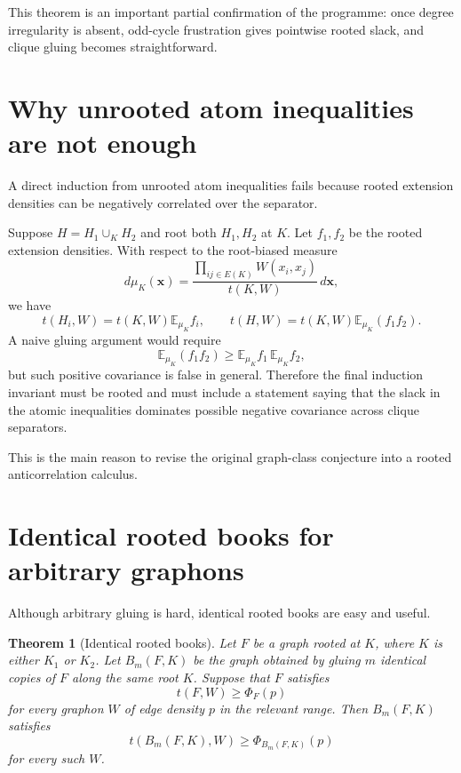 \documentclass[11pt]{article}
\newtheorem{theorem}{Theorem}[section]
\theoremstyle{definition}
\newcommand{\E}{\mathbb E}
\begin{document}
This theorem is an important partial confirmation of the programme: once degree irregularity is absent, odd-cycle frustration gives pointwise rooted slack, and clique gluing becomes straightforward.

\section{Why unrooted atom inequalities are not enough}

A direct induction from unrooted atom inequalities fails because rooted extension densities can be negatively correlated over the separator.

Suppose $H=H_1\cup_K H_2$ and root both $H_1,H_2$ at $K$.  Let $f_1,f_2$ be the rooted extension densities.  With respect to the root-biased measure
\[
  d\mu_K(\mathbf x)=\frac{\prod_{ij\in E(K)}W(x_i,x_j)}{t(K,W)}\,d\mathbf x,
\]
we have
\[
  t(H_i,W)=t(K,W)\E_{\mu_K}f_i,
  \qquad
  t(H,W)=t(K,W)\E_{\mu_K}(f_1f_2).
\]
A naive gluing argument would require
\[
  \E_{\mu_K}(f_1f_2)
  \ge \E_{\mu_K}f_1\,\E_{\mu_K}f_2,
\]
but such positive covariance is false in general.  Therefore the final induction invariant must be rooted and must include a statement saying that the slack in the atomic inequalities dominates possible negative covariance across clique separators.

This is the main reason to revise the original graph-class conjecture into a rooted anticorrelation calculus.

\section{Identical rooted books for arbitrary graphons}

Although arbitrary gluing is hard, identical rooted books are easy and useful.

\begin{theorem}[Identical rooted books]\label{thm:identical-books}
Let $F$ be a graph rooted at $K$, where $K$ is either $K_1$ or $K_2$.  Let $B_m(F,K)$ be the graph obtained by gluing $m$ identical copies of $F$ along the same root $K$.  Suppose that $F$ satisfies
\[
  t(F,W)\ge \Phi_F(p)
\]
for every graphon $W$ of edge density $p$ in the relevant range.  Then $B_m(F,K)$ satisfies
\[
  t(B_m(F,K),W)\ge \Phi_{B_m(F,K)}(p)
\]
for every such $W$.
\end{theorem}
\end{document}

